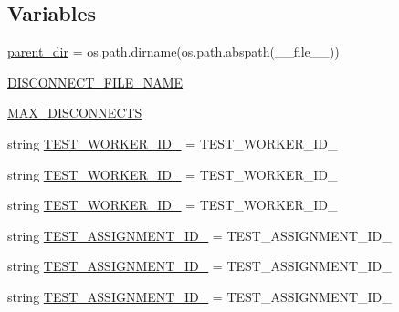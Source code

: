 \subsection*{Variables}
\begin{DoxyCompactItemize}
\item 
\hyperlink{namespaceparlai_1_1mturk_1_1core_1_1test_1_1test__worker__manager_a7bbd9736120169478f675253fddb1b69}{parent\+\_\+dir} = os.\+path.\+dirname(os.\+path.\+abspath(\+\_\+\+\_\+file\+\_\+\+\_\+))
\item 
\hyperlink{namespaceparlai_1_1mturk_1_1core_1_1test_1_1test__worker__manager_a0a27f1890c4ce41045b7ddb3a86d90d6}{D\+I\+S\+C\+O\+N\+N\+E\+C\+T\+\_\+\+F\+I\+L\+E\+\_\+\+N\+A\+ME}
\item 
\hyperlink{namespaceparlai_1_1mturk_1_1core_1_1test_1_1test__worker__manager_ab47ac2513341a5d06233e00af74b98e1}{M\+A\+X\+\_\+\+D\+I\+S\+C\+O\+N\+N\+E\+C\+TS}
\item 
string \hyperlink{namespaceparlai_1_1mturk_1_1core_1_1test_1_1test__worker__manager_a3068f8a5346d785fbdc5800eba8079ec}{T\+E\+S\+T\+\_\+\+W\+O\+R\+K\+E\+R\+\_\+\+I\+D\+\_} = \textquotesingle{}T\+E\+S\+T\+\_\+\+W\+O\+R\+K\+E\+R\+\_\+\+I\+D\+\_\textquotesingle{}
\item 
string \hyperlink{namespaceparlai_1_1mturk_1_1core_1_1test_1_1test__worker__manager_ad946a2b6bf772993733b60db9f24882a}{T\+E\+S\+T\+\_\+\+W\+O\+R\+K\+E\+R\+\_\+\+I\+D\+\_} = \textquotesingle{}T\+E\+S\+T\+\_\+\+W\+O\+R\+K\+E\+R\+\_\+\+I\+D\+\_\textquotesingle{}
\item 
string \hyperlink{namespaceparlai_1_1mturk_1_1core_1_1test_1_1test__worker__manager_ae03afc878946a79d958abb479807291b}{T\+E\+S\+T\+\_\+\+W\+O\+R\+K\+E\+R\+\_\+\+I\+D\+\_} = \textquotesingle{}T\+E\+S\+T\+\_\+\+W\+O\+R\+K\+E\+R\+\_\+\+I\+D\+\_\textquotesingle{}
\item 
string \hyperlink{namespaceparlai_1_1mturk_1_1core_1_1test_1_1test__worker__manager_a273ce8bc05b189240962d8699c67afcd}{T\+E\+S\+T\+\_\+\+A\+S\+S\+I\+G\+N\+M\+E\+N\+T\+\_\+\+I\+D\+\_} = \textquotesingle{}T\+E\+S\+T\+\_\+\+A\+S\+S\+I\+G\+N\+M\+E\+N\+T\+\_\+\+I\+D\+\_\textquotesingle{}
\item 
string \hyperlink{namespaceparlai_1_1mturk_1_1core_1_1test_1_1test__worker__manager_a418a17340af180dc4078c216d930e307}{T\+E\+S\+T\+\_\+\+A\+S\+S\+I\+G\+N\+M\+E\+N\+T\+\_\+\+I\+D\+\_} = \textquotesingle{}T\+E\+S\+T\+\_\+\+A\+S\+S\+I\+G\+N\+M\+E\+N\+T\+\_\+\+I\+D\+\_\textquotesingle{}
\item 
string \hyperlink{namespaceparlai_1_1mturk_1_1core_1_1test_1_1test__worker__manager_a0f7f89124176daae812e9b93a3da4230}{T\+E\+S\+T\+\_\+\+A\+S\+S\+I\+G\+N\+M\+E\+N\+T\+\_\+\+I\+D\+\_} = \textquotesingle{}T\+E\+S\+T\+\_\+\+A\+S\+S\+I\+G\+N\+M\+E\+N\+T\+\_\+\+I\+D\+\_\textquotesingle{}

\end{DoxyCompactItemize}
